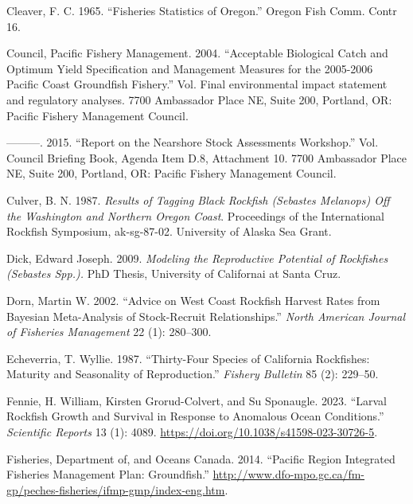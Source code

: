 \documentclass[11pt,
  english,
  letterpaper,
]{article}
\newlength{\cslhangindent}
\newenvironment{CSLReferences}[2] %
 {%
  \setlength{\parindent}{0pt}
  \ifodd #1 \everypar{\setlength{\hangindent}{\cslhangindent}}\ignorespaces\fi
  \ifnum #2 > 0
  \setlength{\parskip}{#2\baselineskip}
  \fi
 }%
 {}
\begin{document}
\begin{CSLReferences}{1}{0}
\leavevmode{}%
Cleaver, F. C. 1965. {``Fisheries Statistics of Oregon.''} Oregon Fish Comm. Contr 16.

\leavevmode{}%
Council, Pacific Fishery Management. 2004. {``Acceptable Biological Catch and Optimum Yield Specification and Management Measures for the 2005-2006 Pacific Coast Groundfish Fishery.''} Vol. Final environmental impact statement and regulatory analyses. 7700 Ambassador Place NE, Suite 200, Portland, OR: Pacific Fishery Management Council.

\leavevmode{}%
---------. 2015. {``Report on the Nearshore Stock Assessments Workshop.''} Vol. Council Briefing Book, Agenda Item D.8, Attachment 10. 7700 Ambassador Place NE, Suite 200, Portland, OR: Pacific Fishery Management Council.

\leavevmode{}%
Culver, B. N. 1987. \emph{Results of Tagging Black Rockfish (Sebastes Melanops) Off the Washington and Northern Oregon Coast}. Proceedings of the International Rockfish Symposium, ak-sg-87-02. University of Alaska Sea Grant.

\leavevmode{}%
Dick, Edward Joseph. 2009. \emph{Modeling the {Reproductive} {Potential} of {Rockfishes} (\emph{Sebastes} {Spp}.).} PhD Thesis, University of Californai at Santa Cruz.

\leavevmode{}%
Dorn, Martin W. 2002. {``Advice on {West} {Coast} Rockfish Harvest Rates from {B}ayesian Meta-Analysis of Stock-Recruit Relationships.''} \emph{North American Journal of Fisheries Management} 22 (1): 280--300.

\leavevmode{}%
Echeverria, T. Wyllie. 1987. {``Thirty-Four Species of California Rockfishes: Maturity and Seasonality of Reproduction.''} \emph{Fishery Bulletin} 85 (2): 229--50.

\leavevmode{}%
Fennie, H. William, Kirsten Grorud-Colvert, and Su Sponaugle. 2023. {``Larval Rockfish Growth and Survival in Response to Anomalous Ocean Conditions.''} \emph{Scientific Reports} 13 (1): 4089. \url{https://doi.org/10.1038/s41598-023-30726-5}.

\leavevmode{}%
Fisheries, Department of, and Oceans Canada. 2014. {``Pacific Region Integrated Fisheries Management Plan: Groundfish.''} \url{http://www.dfo-mpo.gc.ca/fm-gp/peches-fisheries/ifmp-gmp/index-eng.htm}.


\end{CSLReferences}
\end{document}
